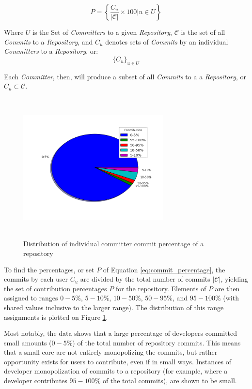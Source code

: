 \documentclass{proc}
\begin{document}
{{{{{\begin{equation}
P = \left\{ \frac{ C_u } { |\mathscr{C}| } \times 100 \Big| u \in U \right\}
\label{eq:commit_percentage}
\end{equation}

Where $U$ is the Set of \textit{Committers} to a given \textit{Repository}, $\mathscr{C}$ is the set of all \textit{Commits} to a \textit{Repository}, and $C_u$ denotes sets of \textit{Commits} by an individual \textit{Committers} to a \textit{Repository}, or:
 \[ \{ C_u \}_{u \in U} \]

Each \textit{Committer}, then, will produce a subset of all \textit{Commits} to a a \textit{Repository}, or $C_u \subset \mathscr{C}$. 

\begin{figure}
\includegraphics[height=3in,width=3in]{images/committers_percentage_pie_chart.png}
\caption{Distribution of individual committer commit percentage of a repository}
\label{fig:committers_percentage_pie_chart}
\end{figure}

To find the percentages, or set $P$ of Equation \ref{eq:commit_percentage}, the commits by each user $C_u$ are divided by the total number of commits $|\mathscr{C}|$, yielding the set of contribution percentages $P$ for the repository. Elements of $P$ are then assigned to ranges $0-5\%$, $5-10\%$, $10-50\%$, $50-95\%$, and $95-100\%$ (with shared values inclusive to the larger range). The distribution of this range assignments is plotted on Figure \ref{fig:committers_percentage_pie_chart}.

Most notably, the data shows that a large percentage of developers committed small amounts ($0-5\%$) of the total number of repository commits. This means that a small core are not entirely monopolizing the commits, but rather opportunity exists for users to contribute, even if in small ways. Instances of developer monopolization of commits to a repository (for example, where a developer contributes $95-100\%$ of the total commits), are shown to be small.

}}}}}
\end{document}
